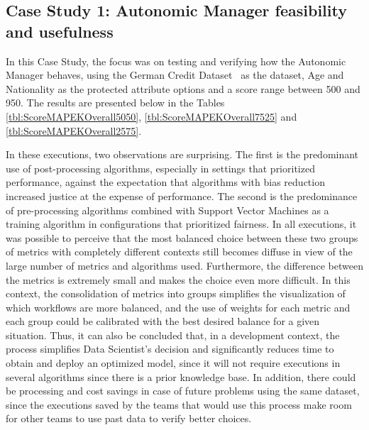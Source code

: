 \documentclass[runningheads]{llncs}
\begin{document}
\subsection{Case Study 1: Autonomic Manager feasibility and usefulness}

In this Case Study, the focus was on testing and verifying how the Autonomic Manager behaves, using the German Credit Dataset~\citep{ucigerman_2021} as the dataset, Age and Nationality as the protected attribute options and a score range between 500 and 950. The results are presented below in the Tables \ref{tbl:ScoreMAPEKOverall5050}, \ref{tbl:ScoreMAPEKOverall7525} and \ref{tbl:ScoreMAPEKOverall2575}.

In these executions, two observations are surprising. The first is the predominant use of post-processing algorithms, especially in settings that prioritized performance, against the expectation that algorithms with bias reduction increased justice at the expense of performance. The second is the predominance of pre-processing algorithms combined with Support Vector Machines as a training algorithm in configurations that prioritized fairness.
In all executions, it was possible to perceive that the most balanced choice between these two groups of metrics with completely different contexts still becomes diffuse in view of the large number of metrics and algorithms used. Furthermore, the difference between the metrics is extremely small and makes the choice even more difficult. In this context, the consolidation of metrics into groups simplifies the visualization of which workflows are more balanced, and the use of weights for each metric and each group could be calibrated with the best desired balance for a given situation. Thus, it can also be concluded that, in a development context, the process simplifies Data Scientist's decision and significantly reduces time to obtain and deploy an optimized model, since it will not require executions in several algorithms since there is a prior knowledge base. In addition, there could be processing and cost savings in case of future problems using the same dataset, since the executions saved by the teams that would use this process make room for other teams to use past data to verify better choices.
\end{document}
